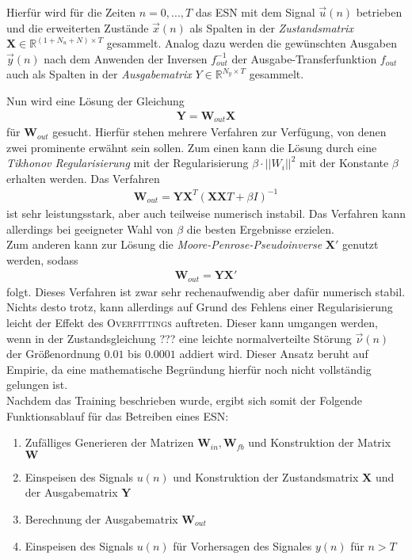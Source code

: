 Hierfür wird für die Zeiten $n=0, ..., T$ das \textsc{ESN} mit dem Signal $\vec{u}(n)$ betrieben und die erweiterten Zustände $\vec{x}(n)$ als Spalten in der \textit{Zustandsmatrix} $\mathbf{X} \in \mathbb{R}^{(1 + N_u + N) \times T}$ gesammelt. Analog dazu werden die gewünschten Ausgaben $\vec{y}(n)$ nach dem Anwenden der Inversen $f^{-1}_{out}$ der Ausgabe-Transferfunktion $f_{out}$ auch als Spalten in der \textit{Ausgabematrix} $Y \in \mathbb{R}^{N_y \times T}$ gesammelt.

Nun wird eine Lösung der Gleichung
\begin{align}
\mathbf{Y} = \mathbf{W}_{out} \mathbf{X}
\end{align}
für $\mathbf{W}_{out}$ gesucht. Hierfür stehen mehrere Verfahren zur Verfügung, von denen zwei prominente erwähnt sein sollen.
Zum einen kann die Lösung durch eine \textit{Tikhonov Regularisierung} mit der Regularisierung $\beta \cdot ||{W_i}||^2$ mit der Konstante $\beta$ erhalten werden. Das Verfahren
\begin{align}
\mathbf{W}_{out} = \mathbf{Y} \mathbf{X}^T \left(\mathbf{X} \mathbf{X}T + \beta I \right)^{-1}
\end{align}
ist sehr leistungsstark, aber auch teilweise numerisch instabil. Das Verfahren kann allerdings bei geeigneter Wahl von $\beta$ die besten Ergebnisse erzielen.\\

Zum anderen kann zur Lösung die \textit{Moore-Penrose-Pseudoinverse} $\mathbf{X}'$ genutzt werden, sodass
\begin{align}
\mathbf{W}_{out} = \mathbf{Y} \mathbf{X}'
\end{align}
folgt. Dieses Verfahren ist zwar sehr rechenaufwendig aber dafür numerisch stabil. Nichts desto trotz, kann allerdings auf Grund des Fehlens einer Regularisierung leicht der Effekt des \textsc{Overfittings} auftreten. Dieser kann umgangen werden, wenn in der Zustandsgleichung ??? eine leichte normalverteilte Störung $\vec{\nu}(n)$ der Größenordnung $0.01$ bis $0.0001$ addiert wird. Dieser Ansatz beruht auf Empirie, da eine mathematische Begründung hierfür noch nicht vollständig gelungen ist.\\

Nachdem das Training beschrieben wurde, ergibt sich somit der Folgende Funktionsablauf für das Betreiben eines \textsc{ESN}:

\begin{enumerate}
\item Zufälliges Generieren der Matrizen $\mathbf{W}_{in}, \mathbf{W}_{fb}$ und Konstruktion der Matrix $\mathbf{W}$ \\

\item Einspeisen des Signals $u(n)$ und Konstruktion der Zustandsmatrix $\mathbf{X}$ und der Ausgabematrix $\mathbf{Y}$ \\

\item Berechnung der Ausgabematrix $\mathbf{W}_{out}$\\

\item Einspeisen des Signals $u(n)$ für Vorhersagen des Signales $y(n)$ für $n > T$
\end{enumerate}